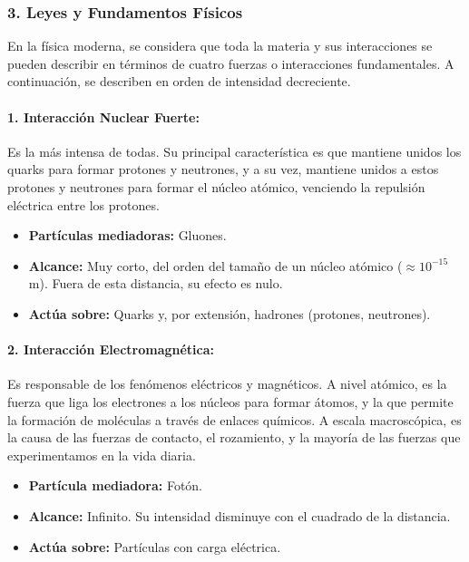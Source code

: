 \subsubsection*{3. Leyes y Fundamentos Físicos}
En la física moderna, se considera que toda la materia y sus interacciones se pueden describir en términos de cuatro fuerzas o interacciones fundamentales. A continuación, se describen en orden de intensidad decreciente.

\paragraph{1. Interacción Nuclear Fuerte:}
Es la más intensa de todas. Su principal característica es que mantiene unidos los quarks para formar protones y neutrones, y a su vez, mantiene unidos a estos protones y neutrones para formar el núcleo atómico, venciendo la repulsión eléctrica entre los protones.
\begin{itemize}
    \item \textbf{Partículas mediadoras:} Gluones.
    \item \textbf{Alcance:} Muy corto, del orden del tamaño de un núcleo atómico ($\approx 10^{-15}$ m). Fuera de esta distancia, su efecto es nulo.
    \item \textbf{Actúa sobre:} Quarks y, por extensión, hadrones (protones, neutrones).
\end{itemize}

\paragraph{2. Interacción Electromagnética:}
Es responsable de los fenómenos eléctricos y magnéticos. A nivel atómico, es la fuerza que liga los electrones a los núcleos para formar átomos, y la que permite la formación de moléculas a través de enlaces químicos. A escala macroscópica, es la causa de las fuerzas de contacto, el rozamiento, y la mayoría de las fuerzas que experimentamos en la vida diaria.
\begin{itemize}
    \item \textbf{Partícula mediadora:} Fotón.
    \item \textbf{Alcance:} Infinito. Su intensidad disminuye con el cuadrado de la distancia.
    \item \textbf{Actúa sobre:} Partículas con carga eléctrica.
\end{itemize}

